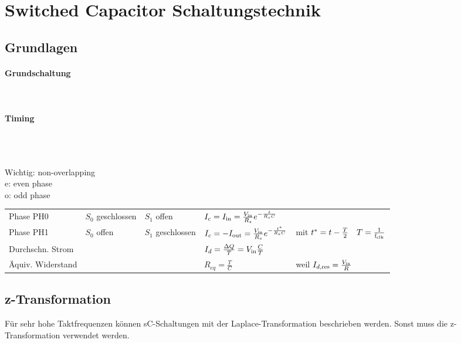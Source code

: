 \section{Switched Capacitor Schaltungstechnik}

\subsection{Grundlagen}

\begin{multicols}{2}
	\paragraph{Grundschaltung}~\\
	
	\vfill
	\columnbreak
	
	\paragraph{Timing}~\\
	\begin{center}
		 \\
		Wichtig: non-overlapping \\
		e: even phase \\
		o: odd phase
	\end{center}

\end{multicols}
	
\begin{tabular}{lllll}
	Phase PH0 & $S_0$ geschlossen & $S_1$ offen & $I_c = I_{\operatorname{\text{in}}} = \frac{V_{\operatorname{\text{in}}}}{R_s} e^{-\frac{t}{R_s C}}$ & \\
	Phase PH1 & $S_0$ offen & $S_1$ geschlossen & $I_c = -I_{\operatorname{\text{out}}} = \frac{V_{\operatorname{\text{in}}}}{R_s} e^{-\frac{t^*}{R_s C}}$ & mit $t^* = t - \frac{T}{2} \quad T=\frac{1}{\operatorname{f_{\text{clk}}}}$ \\
	Durchschn. Strom & & & $I_d = \frac{\Delta Q}{T} = V_{\operatorname{\text{in}}} \frac{C}{T}$ \\
	Äquiv. Widerstand & & & $R_{eq} = \frac{T}{C}$ & weil $I_{d,\text{res}} = \frac{V_{\operatorname{\text{in}}}}{R}$ \\
\end{tabular}
	 
\subsection{z-Transformation}
Für sehr hohe Taktfrequenzen können sC-Schaltungen mit der Laplace-Transformation beschrieben werden.
Sonst muss die z-Transformation verwendet werden.

